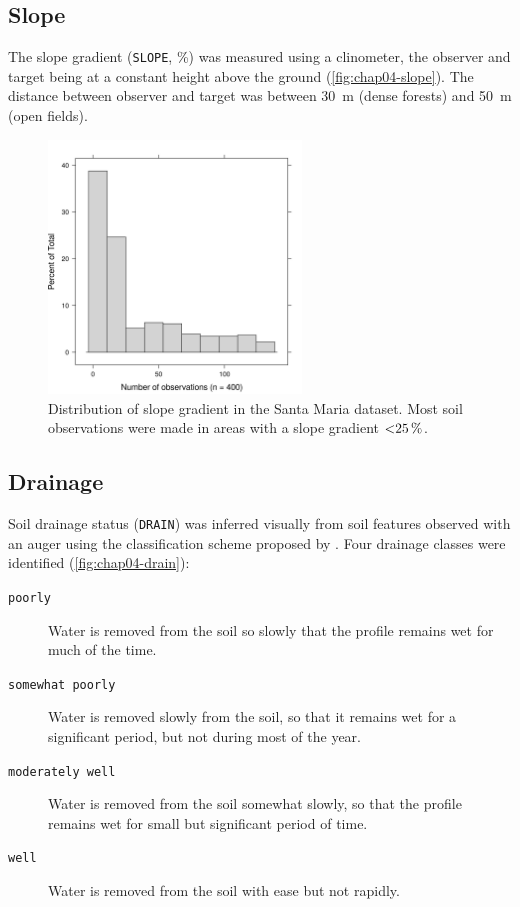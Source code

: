 \subsection{Slope}

The slope gradient (\texttt{SLOPE}, \si{\percent}) was measured using a clinometer, the observer and target 
being at a constant height above the ground (\autoref{fig:chap04-slope}). The distance between observer and 
target was between \SI{30}{\metre} (dense forests) and \SI{50}{\metre} (open fields).

\begin{figure}[!ht]
\centering
\includegraphics[width=0.60\textwidth]{fig/chap04-slope}
\caption[Distribution of slope gradient in the Santa Maria dataset.]{Distribution of slope gradient in the 
Santa Maria dataset. Most soil observations were made in areas with a slope gradient $\SI{<25}{\percent}$.}
\label{fig:chap04-slope}
\end{figure}

\subsection{Drainage}

Soil drainage status (\texttt{DRAIN}) was inferred visually from soil features observed with an auger using 
the classification scheme proposed by \citet{SantosEtAl2013}. Four drainage classes were identified 
(\autoref{fig:chap04-drain}):

\begin{description}
\item[\texttt{poorly}] Water is removed from the soil so slowly that the profile remains wet for much of the 
time.

\item[\texttt{somewhat poorly}] Water is removed slowly from the soil, so that it remains wet for a 
significant period, but not during most of the year.

\item[\texttt{moderately well}] Water is removed from the soil somewhat slowly, so that the profile remains 
wet for small but significant period of time.

\item[\texttt{well}] Water is removed from the soil with ease but not rapidly.
\end{description}

